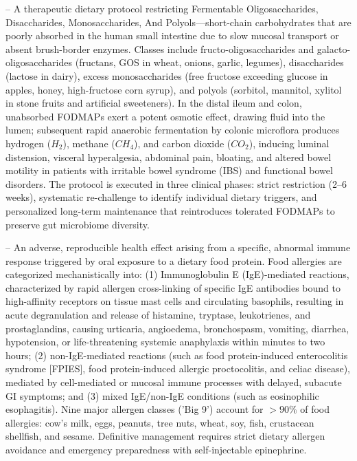 -- A therapeutic dietary protocol restricting Fermentable Oligosaccharides, Disaccharides, Monosaccharides, And Polyols---short-chain carbohydrates that are poorly absorbed in the human small intestine due to slow mucosal transport or absent brush-border enzymes. Classes include fructo-oligosaccharides and galacto-oligosaccharides (fructans, GOS in wheat, onions, garlic, legumes), disaccharides (lactose in dairy), excess monosaccharides (free fructose exceeding glucose in apples, honey, high-fructose corn syrup), and polyols (sorbitol, mannitol, xylitol in stone fruits and artificial sweeteners). In the distal ileum and colon, unabsorbed FODMAPs exert a potent osmotic effect, drawing fluid into the lumen; subsequent rapid anaerobic fermentation by colonic microflora produces hydrogen ($H_2$), methane ($CH_4$), and carbon dioxide ($CO_2$), inducing luminal distension, visceral hyperalgesia, abdominal pain, bloating, and altered bowel motility in patients with irritable bowel syndrome (IBS) and functional bowel disorders. The protocol is executed in three clinical phases: strict restriction (2--6 weeks), systematic re-challenge to identify individual dietary triggers, and personalized long-term maintenance that reintroduces tolerated FODMAPs to preserve gut microbiome diversity.

-- An adverse, reproducible health effect arising from a specific, abnormal immune response triggered by oral exposure to a dietary food protein. Food allergies are categorized mechanistically into: (1) Immunoglobulin E (IgE)-mediated reactions, characterized by rapid allergen cross-linking of specific IgE antibodies bound to high-affinity receptors on tissue mast cells and circulating basophils, resulting in acute degranulation and release of histamine, tryptase, leukotrienes, and prostaglandins, causing urticaria, angioedema, bronchospasm, vomiting, diarrhea, hypotension, or life-threatening systemic anaphylaxis within minutes to two hours; (2) non-IgE-mediated reactions (such as food protein-induced enterocolitis syndrome [FPIES], food protein-induced allergic proctocolitis, and celiac disease), mediated by cell-mediated or mucosal immune processes with delayed, subacute GI symptoms; and (3) mixed IgE/non-IgE conditions (such as eosinophilic esophagitis). Nine major allergen classes ('Big 9') account for $>90\%$ of food allergies: cow's milk, eggs, peanuts, tree nuts, wheat, soy, fish, crustacean shellfish, and sesame. Definitive management requires strict dietary allergen avoidance and emergency preparedness with self-injectable epinephrine.

